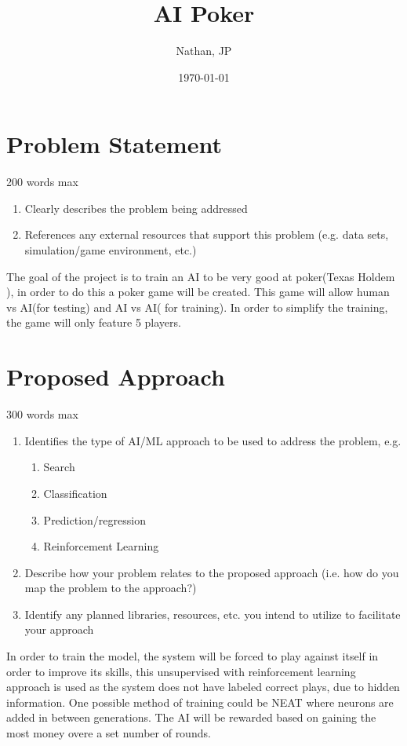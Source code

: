 \documentclass[11pt]{article}
\title{AI Poker}
\author{Nathan, JP}
\date{\today}
\begin{document}
\maketitle
\section{Problem Statement}
200 words max
\begin{enumerate}
\item Clearly describes the problem being addressed
\item References any external resources that support this problem (e.g. data sets, simulation/game environment,
  etc.)
\end{enumerate}

The goal of the project is to train an AI to be very good at poker(Texas Holdem \cite{TexasHoldEm}),
in order to do this a poker game will be created. This game will allow human vs AI(for testing) and AI vs AI(
for training). In order to simplify the training, the game will only feature 5 players.

\section{Proposed Approach}
300 words max
\begin{enumerate}
\item Identifies the type of AI/ML approach to be used to address the problem, e.g.
  \begin{enumerate}
  \item Search
  \item Classification
  \item Prediction/regression
  \item Reinforcement Learning
  \end{enumerate}
\item Describe how your problem relates to the proposed approach (i.e. how do you map the problem to the
  approach?)
\item Identify any planned libraries, resources, etc. you intend to utilize to facilitate your approach
\end{enumerate}
In order to train the model, the system will be forced to play against itself in order to improve its skills,
this unsupervised with reinforcement learning approach is used as the system does not have labeled correct
plays, due to hidden information. One possible method of training could be NEAT\cite{NEAT} where neurons are
added in between generations. The AI will be rewarded based on gaining the most money overe a set number of rounds.
\end{document}

